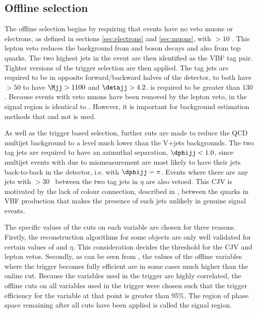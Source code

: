 \subsection{Offline selection}
\label{sec:promptofflinesel}
The offline selection begins by requiring that events have no veto muons or electrons, as defined in sections \ref{sec:electrons} and \ref{sec:muons}, with \pt$>10$ \GeV. This lepton veto reduces the background from \PW and \PZ boson decays and also from top quarks. The two highest \pt jets in the event are then identified as the VBF tag pair. Tighter versions of the trigger selection are then applied. The tag jets are required to be in opposite forward/backward halves of the detector, to both have \pt$>50$ \GeV to have $\Mjj>1100$ \GeV and $\detajj>4.2$. \METnoMU is required to be greater than 130 \GeV. Because events with veto muons have been removed by the lepton veto, \METnoMU in the signal region is identical to \MET. However, it is important for background estimation methods that \METnoMU and not \MET is used.

As well as the trigger based selection, further cuts are made to reduce the \ac{QCD} multijet background to a level much lower than the V+jets backgrounds. The two tag jets are required to have an azimuthal separation, $\dphijj<1.0$, since multijet events with \MET due to mismeasurement are most likely to have their jets back-to-back in the detector, i.e. with $\dphijj=\pi$. Events where there are any jets with \pt$>30$ \GeV\, between the two tag jets in $\eta$ are also vetoed. This \ac{CJV} is motivated by the lack of colour connection, described in , between the quarks in VBF production that makes the presence of such jets unlikely in genuine signal events.

The specific values of the cuts on each variable are chosen for three reasons. Firstly, the reconstruction algorithms for some objects are only well validated for certain values of \pt and $\eta$. This consideration decides the threshold for the \ac{CJV} and lepton vetos. Secondly, as can be seen from , the values of the offline variables where the trigger becomes fully efficient are in some cases much higher than the online cut. Because the variables used in the trigger are highly correlated, the offline cuts on all variables used in the trigger were chosen such that the trigger efficiency for the variable at that point is greater than 95\%. The region of phase space remaining after all cuts have been applied is called the signal region.

